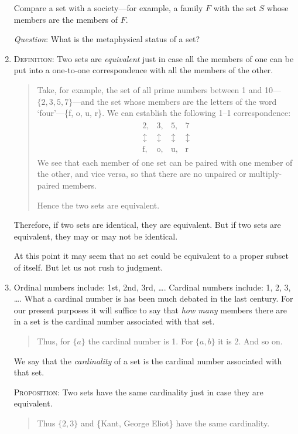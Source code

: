 \documentclass[twoside,openright]{article}
\begin{document}
\begin{enumerate}
  Compare a set with a society---for example, a family $F$ with the
  set $S$ whose members are the members of $F$.

  \emph{Question}: What is the metaphysical status of a set?
\item \textsc{Definition}\label{equivalence}: Two sets are
  \emph{equivalent} just in case all the members of one can be put
  into a one-to-one correspondence with all the members of the other.
  \begin{quote}
    {\small Take, for example, the set of all prime
      numbers between 1 and 10---$\{2,3,5,7\}$---and the set whose
      members are the letters of the word `four'---\{f, o, u, r\}. We
      can establish the following 1--1 correspondence:
      \begin{align*}
        \begin{matrix}
          2,&3,&5,&7\\
          \updownarrow\, &\updownarrow\, & \updownarrow\, &\updownarrow\\
          \textrm{f},&\textrm{o},&\textrm{u},&\textrm{r}
        \end{matrix}
      \end{align*}
      We see that each member of one set can be paired with one member
      of the other, and vice versa, so that there are no unpaired or
      multiply-paired members.

Hence the two sets are equivalent.}
\end{quote}
Therefore, if two sets are identical, they are equivalent. But if two
sets are equivalent, they may or may not be identical.

At this point it may seem that no set could be equivalent to a proper
subset of itself. But let us not rush to judgment.
\item \label{cardinal}Ordinal numbers include: 1st, 2nd, 3rd,
  \ldots. Cardinal numbers include: 1, 2, 3, \ldots. What a cardinal
  number is has been much debated in the last century. For our present
  purposes it will suffice to say that \emph{how many} members there
  are in a set is the cardinal number associated with that set.
  \begin{quote} {\small Thus, for $\{a\}$ the cardinal number is
      1. For $\{a,b\}$ it is 2. And so on.}
  \end{quote}
  We say that the \emph{cardinality} of a set is the cardinal number
  associated with that set.

  \textsc{Proposition}: Two sets have the same cardinality just in
  case they are equivalent.
  \begin{quote} {\small Thus $\{2,3\}$ and \{Kant, George Eliot\} have
      the same cardinality.  }\end{quote}


\end{enumerate}
\end{document}
